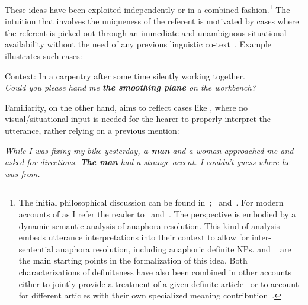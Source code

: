 \documentclass[output=paper
,modfonts
,nonflat]{langsci/langscibook}
\begin{document}
These ideas have been exploited independently or in a combined fashion.\footnote{The initial philosophical discussion can be found in~\citet{Frege1892};~\citet{Russell1905} and~\citet{Strawson1950}. For modern accounts of  as  I refer the reader to~\citet{Hawkins1978,Hawkins1991} and~\citet{Abbott1999}. The  perspective is embodied by a dynamic semantic analysis of anaphora resolution. This kind of analysis embeds utterance interpretations into their  context to allow for inter-sentential anaphora resolution, including anaphoric definite NPs.  \citep{Kamp1981} and ~\citep{Heim1982} are the main starting points in the formalization of this idea. Both characterizations of definiteness have also been combined in other accounts either to jointly provide a treatment of a given definite article~\citep{Farkas2002,Roberts2003} or to account for different articles with their own specialized meaning contribution~\citep{Schwarz2009,Schwarz2013}.} The intuition that  involves the uniqueness of the referent is motivated by cases where the referent is picked out through an immediate and unambiguous situational availability without the need of any previous linguistic co-text~\citep[see][103, 110]{Hawkins1978}. Example  illustrates such cases:

\ea \label{ex:pico:2}
Context: In a carpentry after some time silently working together. \\  
\textit{Could you please hand me \textbf{the smoothing plane} on the workbench?}
\z

Familiarity, on the other hand, aims to reflect cases like , where no visual/situational input is needed for the hearer to properly interpret the utterance, rather relying on a previous mention:

\ea \label{ex:pico:3}
\textit{While I was fixing my bike yesterday, \textbf{a man} and a woman approached me and asked for directions. \textbf{The man} had a strange accent. I couldn't guess where he was from.}
\z
\end{document}
